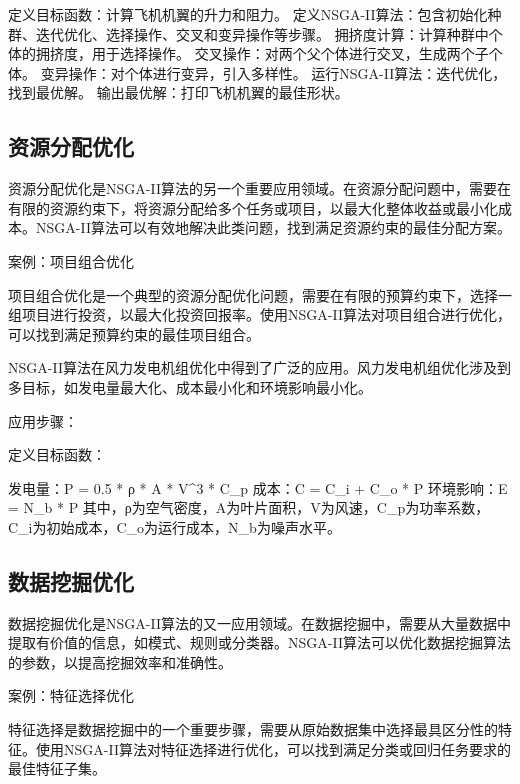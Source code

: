 \documentclass[cn,hazy,black,normal]{elegantnote}
\begin{document}
定义目标函数：计算飞机机翼的升力和阻力。
定义NSGA-II算法：包含初始化种群、迭代优化、选择操作、交叉和变异操作等步骤。
拥挤度计算：计算种群中个体的拥挤度，用于选择操作。
交叉操作：对两个父个体进行交叉，生成两个子个体。
变异操作：对个体进行变异，引入多样性。
运行NSGA-II算法：迭代优化，找到最优解。
输出最优解：打印飞机机翼的最佳形状。

\subsection{资源分配优化}

资源分配优化是NSGA-II算法的另一个重要应用领域。在资源分配问题中，需要在有限的资源约束下，将资源分配给多个任务或项目，以最大化整体收益或最小化成本。NSGA-II算法可以有效地解决此类问题，找到满足资源约束的最佳分配方案。

案例：项目组合优化

项目组合优化是一个典型的资源分配优化问题，需要在有限的预算约束下，选择一组项目进行投资，以最大化投资回报率。使用NSGA-II算法对项目组合进行优化，可以找到满足预算约束的最佳项目组合。

NSGA-II算法在风力发电机组优化中得到了广泛的应用。风力发电机组优化涉及到多目标，如发电量最大化、成本最小化和环境影响最小化。

应用步骤：

定义目标函数：

发电量：P = 0.5 * ρ * A * V^3 * C_p
成本：C = C_i + C_o * P
环境影响：E = N_b * P
其中，ρ为空气密度，A为叶片面积，V为风速，C_p为功率系数，C_i为初始成本，C_o为运行成本，N_b为噪声水平。

\subsection{数据挖掘优化}
数据挖掘优化是NSGA-II算法的又一应用领域。在数据挖掘中，需要从大量数据中提取有价值的信息，如模式、规则或分类器。NSGA-II算法可以优化数据挖掘算法的参数，以提高挖掘效率和准确性。

案例：特征选择优化

特征选择是数据挖掘中的一个重要步骤，需要从原始数据集中选择最具区分性的特征。使用NSGA-II算法对特征选择进行优化，可以找到满足分类或回归任务要求的最佳特征子集。
\end{document}

